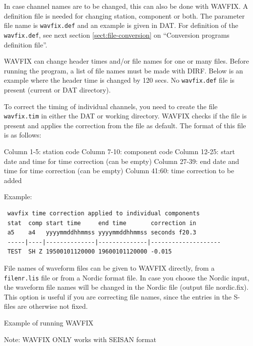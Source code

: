 In case channel names are to be changed, this can also be done with WAVFIX. A definition file is needed for changing station, component or both. The parameter file name is \texttt{wavfix.def} and an example is given in DAT. For definition of the \texttt{wavfix.def}, see next section \ref{sect:file-conversion} on ``Conversion programs definition file''. 

WAVFIX can change header times and/or file names for one or many files. Before running the program, a list of file names must be made with DIRF. Below is an example where the header time is changed by 120 secs. No \texttt{wavfix.def} file is present (current or DAT directory).  

To correct the timing of individual channels, you need to create the file \texttt{wavfix.tim} in either the DAT or working directory. WAVFIX checks if the file is present and applies the correction from the file as default. The format of this file is as follows: 

Column 1-5: station code \newline
Column 7-10: component code \newline
Column 12-25: start date and time for time correction (can be empty) \newline
Column 27-39: end date and time for time correction (can be empty) \newline
Column 41:60: time correction to be added 

Example: 

\begin{verbatim}
 wavfix time correction applied to individual components
 stat  comp start time     end time       correction in
 a5    a4   yyyymmddhhmmss yyyymmddhhmmss seconds f20.3
 -----|----|--------------|--------------|--------------------
 TEST  SH Z 19500101120000 19600101120000 -0.015 
\end{verbatim}

File names of waveform files can be given to WAVFIX directly, from a \texttt{filenr.lis} file or from a Nordic format file. In case you choose the Nordic input, the waveform file names will be changed in the Nordic file (output file nordic.fix). This option is useful if you are correcting file names, since the entries in the S-files are otherwise not fixed. 

Example of running WAVFIX 



Note: WAVFIX ONLY works with SEISAN format 

